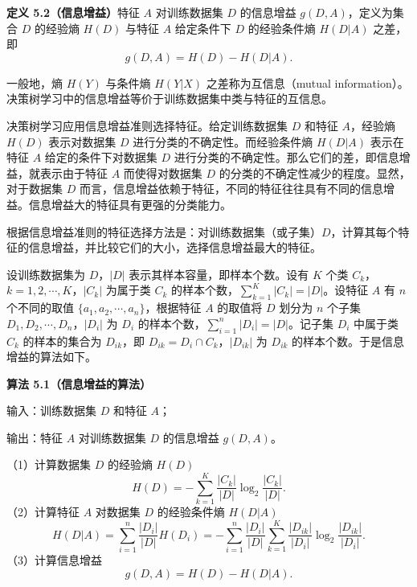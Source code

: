 \documentclass[UTF8,12pt,a4paper,fontset=fandol]{ctexart}
\begin{document}
\noindent\textbf{定义 5.2（信息增益）}\quad 特征 $A$ 对训练数据集 $D$ 的信息增益 $g(D,A)$，定义为集合 $D$ 的经验熵 $H(D)$ 与特征 $A$ 给定条件下 $D$ 的经验条件熵 $H(D|A)$ 之差，即
\begin{equation}
  g(D,A)=H(D)-H(D|A).
  \tag{5.6}
\end{equation}

一般地，熵 $H(Y)$ 与条件熵 $H(Y|X)$ 之差称为互信息（mutual information）。决策树学习中的信息增益等价于训练数据集中类与特征的互信息。

决策树学习应用信息增益准则选择特征。给定训练数据集 $D$ 和特征 $A$，经验熵 $H(D)$ 表示对数据集 $D$ 进行分类的不确定性。而经验条件熵 $H(D|A)$ 表示在特征 $A$ 给定的条件下对数据集 $D$ 进行分类的不确定性。那么它们的差，即信息增益，就表示由于特征 $A$ 而使得对数据集 $D$ 的分类的不确定性减少的程度。显然，对于数据集 $D$ 而言，信息增益依赖于特征，不同的特征往往具有不同的信息增益。信息增益大的特征具有更强的分类能力。

根据信息增益准则的特征选择方法是：对训练数据集（或子集）$D$，计算其每个特征的信息增益，并比较它们的大小，选择信息增益最大的特征。

设训练数据集为 $D$，$|D|$ 表示其样本容量，即样本个数。设有 $K$ 个类 $C_k$，$k=1,2,\cdots,K$，$|C_k|$ 为属于类 $C_k$ 的样本个数，$\sum_{k=1}^{K}|C_k|=|D|$。设特征 $A$ 有 $n$ 个不同的取值 $\{a_1,a_2,\cdots,a_n\}$，根据特征 $A$ 的取值将 $D$ 划分为 $n$ 个子集 $D_1,D_2,\cdots,D_n$，$|D_i|$ 为 $D_i$ 的样本个数，$\sum_{i=1}^{n}|D_i|=|D|$。记子集 $D_i$ 中属于类 $C_k$ 的样本的集合为 $D_{ik}$，即 $D_{ik}=D_i\cap C_k$，$|D_{ik}|$ 为 $D_{ik}$ 的样本个数。于是信息增益的算法如下。

\noindent\textbf{算法 5.1（信息增益的算法）}

输入：训练数据集 $D$ 和特征 $A$；

输出：特征 $A$ 对训练数据集 $D$ 的信息增益 $g(D,A)$。

（1）计算数据集 $D$ 的经验熵 $H(D)$
\begin{equation}
  H(D)=-\sum_{k=1}^{K}\frac{|C_k|}{|D|}\log_2\frac{|C_k|}{|D|}.
  \tag{5.7}
\end{equation}
（2）计算特征 $A$ 对数据集 $D$ 的经验条件熵 $H(D|A)$
\begin{equation}
  H(D|A)=\sum_{i=1}^{n}\frac{|D_i|}{|D|}H(D_i)
  =-\sum_{i=1}^{n}\frac{|D_i|}{|D|}\sum_{k=1}^{K}\frac{|D_{ik}|}{|D_i|}\log_2\frac{|D_{ik}|}{|D_i|}.
  \tag{5.8}
\end{equation}
（3）计算信息增益
\begin{equation}
  g(D,A)=H(D)-H(D|A).
  \tag{5.9}
\end{equation}
\end{document}
